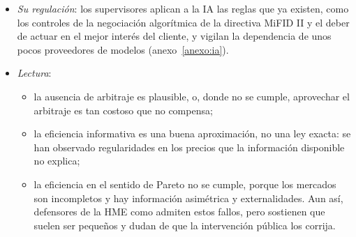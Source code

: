 \documentclass[11pt]{article}
\begin{document}
\begin{itemize}
  \begin{itemize}
  \item \emph{¿Mejora la intermediación financiera?}: probablemente sí, porque abarata la formación financiera y el asesoramiento y acerca a la bolsa, con carteras más diversificadas, a ahorradores que antes no llegaban a ella; a cambio, puede equivocarse con aplomo y trasladar a las decisiones los sesgos de sus datos \parencite{BIS2024AER}.
  \item \emph{¿Bate al mercado?}: no de forma duradera. Es otra vez la paradoja de  y : una ventaja al alcance de todos se arbitra hasta que solo compensa el coste de obtenerla, y la rentabilidad de las estrategias que leen titulares con modelos de lenguaje ya cae a medida que se generalizan \parencite{LopezLiraTang2025Can}.
  \item \emph{¿Hace eficientes los mercados?}: los acerca a la eficiencia semifuerte, porque los precios incorporan antes la información pública, pero no a la completa; y si todos usan modelos parecidos, sus órdenes se correlacionan y pueden amplificar las caídas en los momentos de tensión \parencite{FMI2024GFSR3,FSB2024AI}.
  \end{itemize}
\item \emph{Su regulación}: los supervisores aplican a la IA las reglas que ya existen, como los controles de la negociación algorítmica de la directiva MiFID II y el deber de actuar en el mejor interés del cliente, y vigilan la dependencia de unos pocos proveedores de modelos (anexo~\ref{anexo:ia}).
\item \emph{Lectura}:
  \begin{itemize}
  \item la ausencia de arbitraje es plausible, o, donde no se cumple, aprovechar el arbitraje es tan costoso que no compensa;
  \item la eficiencia informativa es una buena aproximación, no una ley exacta: se han observado regularidades en los precios que la información disponible no explica;
  \item la eficiencia en el sentido de Pareto no se cumple, porque los mercados son incompletos y hay información asimétrica y externalidades. Aun así, defensores de la HME como  admiten estos fallos, pero sostienen que suelen ser pequeños y dudan de que la intervención pública los corrija.
  \end{itemize}
\end{itemize}
\end{document}
